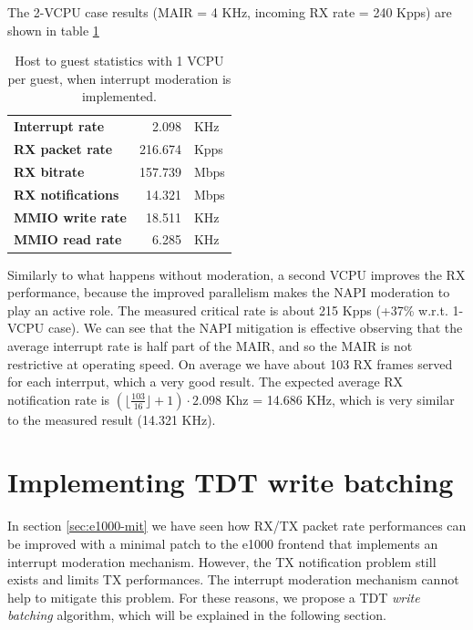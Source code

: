 \vspace{0.5cm}

The 2-VCPU case results (MAIR = 4 KHz, incoming RX rate = 240 Kpps) are shown in table \ref{tab:e1000-mit-rx-g2h2vcpu}

\begin{table}
\begin{center}
\begin{tabular}{lrl}
\toprule
\textbf{Interrupt rate} & 2.098 & KHz\\
\textbf{RX packet rate} & 216.674 & Kpps\\
\textbf{RX bitrate} & 157.739 & Mbps\\
\textbf{RX notifications} & 14.321 & Mbps\\
\textbf{MMIO write rate} & 18.511 & KHz\\
\textbf{MMIO read rate} & 6.285 & KHz\\
\bottomrule
\end{tabular}
\end{center}
\caption{Host to guest statistics with 1 VCPU per guest, when interrupt moderation is implemented.}
\label{tab:e1000-mit-rx-g2h2vcpu}
\end{table}

Similarly to what happens without moderation, a second VCPU improves the RX performance, because the improved parallelism makes the
NAPI moderation to play an active role.
The measured critical rate is about 215 Kpps (+37\% w.r.t. 1-VCPU case).
We can see that the NAPI mitigation is effective observing that the average interrupt rate is half part of the MAIR, and so the MAIR is not
restrictive at operating speed. On average we have about 103 RX frames served for each interrput, which a very good result.
The expected average RX notification rate is $(\lfloor \frac{103}{16} \rfloor + 1) \cdot 2.098$ Khz = 14.686 KHz, which is very similar to
the measured result (14.321 KHz).




\section{Implementing TDT write batching}
In section \ref{sec:e1000-mit} we have seen how RX/TX packet rate performances can be improved with a minimal patch to the
e1000 frontend that implements an interrupt moderation mechanism.
However, the TX notification problem still exists and limits TX performances. The interrupt moderation mechanism cannot help to mitigate
this problem. For these reasons, we propose a TDT \emph{write batching} algorithm, which will be explained in the following section.


